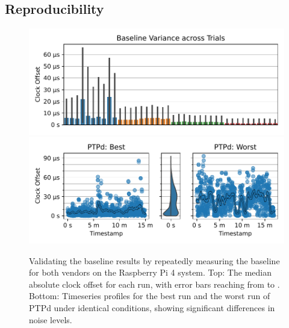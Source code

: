 \subsection{Reproducibility}

\begin{figure}
    \centering
    \includegraphics[width=\linewidth]{res/generated/base/key_metric_variance_rpi-4.pdf}
    \includegraphics[width=\linewidth]{res/generated/base/ptpd-good-vs-bad.pdf}

    \legend
    \caption{Validating the baseline results by repeatedly measuring the baseline for both vendors on the Raspberry Pi 4 system. Top: The median absolute clock offset for each run, with error bars reaching from \PFive{} to \PNineFive{}. Bottom: Timeseries profiles for the best run and the worst run of PTPd under identical conditions, showing significant differences in noise levels.}
    \label{fig:baseline_reproducibility}
\end{figure}



